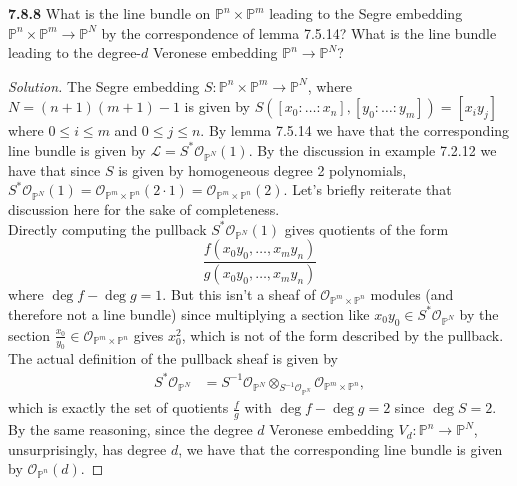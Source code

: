 \documentclass[11pt,letterpaper]{report}
\newcommand{\mcal}[1]{\mathcal{#1}}
\newcommand{\projective}{\mathbb{P}}
\newenvironment{solution}
{\begin{proof}[Solution]}
{\end{proof}}
\begin{document}
\noindent\textbf{7.8.8}
What is the line bundle on $\projective^n\times \projective^m$ leading to the Segre embedding $\projective^n\times \projective^m\to \projective^N$ by the correspondence of lemma 7.5.14? What is the line bundle leading to the degree-$d$ Veronese embedding $\projective^n\to \projective^N$?
\begin{solution}
	The Segre embedding $S: \projective^n\times \projective^m\to \projective^N$, where $N = (n+1)(m+1)-1$ is given by $S([x_0:\ldots : x_n], [y_0:\ldots:y_m]) = [x_iy_j]$ where $0\leq i\leq m$ and $0\leq j\leq n$. By lemma 7.5.14 we have that the corresponding line bundle is given by $\mcal{L} = S^*\mcal{O}_{\projective^N}(1)$. By the discussion in example 7.2.12 we have that since $S$ is given by homogeneous degree 2 polynomials, $S^*\mcal{O}_{\projective^N}(1) = \mcal{O}_{\projective^m\times \projective^n}(2\cdot 1) = \mcal{O}_{\projective^m\times \projective^n}(2)$. Let's briefly reiterate that discussion here for the sake of completeness.\\

	\noindent Directly computing the pullback $S^*\mcal{O}_{\projective^N}(1)$ gives quotients of the form
	\[
	\frac{f(x_0y_0, \ldots, x_my_n)}{g(x_0y_0, \ldots, x_my_n)}
	\]
	where $\deg f - \deg g = 1$. But this isn't a sheaf of $\mcal{O}_{\projective^m\times \projective^n}$ modules (and therefore not a line bundle) since multiplying a section like $x_0y_0 \in S^*\mcal{O}_{\projective^N}$ by the section $\frac{x_0}{y_0}\in \mcal{O}_{\projective^m\times \projective^n}$ gives $x_0^2$, which is not of the form described by the pullback. The actual definition of the pullback sheaf is given by
	\begin{align*}
	S^*\mcal{O}_{\projective^N} &= S^{-1}\mcal{O}_{\projective^N}\otimes_{S^{-1}\mcal{O}_{\projective^N}}\mcal{O}_{\projective^m\times \projective^n},
	\end{align*}
	which is exactly the set of quotients $\frac{f}{g}$ with $\deg f - \deg g = 2$ since $\deg S = 2$.\\

	\noindent By the same reasoning, since the degree $d$ Veronese embedding $V_d: \projective^n\to \projective^N$, unsurprisingly, has degree $d$, we have that the corresponding line bundle is given by $\mcal{O}_{\projective^n}(d)$.
\end{solution}
\end{document}
